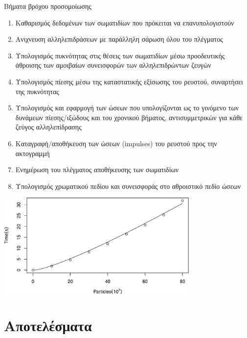 \documentclass[8pt,sans,mathserif,aspectratio=43]{beamer}
\newcommand{\eng}[1]{\selectlanguage{english}#1\selectlanguage{greek}}
\begin{document}

\begin{frame}{Βήματα βρόχου προσομοίωσης}
  \begin{enumerate}
  \item Καθαρισμός δεδομένων των σωματιδίων που πρόκειται να επανυπολογιστούν \pause
  \item Ανιχνευση αλληλεπιδράσεων με παράλληλη σάρωση όλου του πλέγματος \pause
  \item Υπολογισμός πυκνότητας στις θέσεις των σωματιδίων μέσω προοδευτικής άθροισης των
    αμοιβαίων συνεισφορών των αλληλεπιδρώντων ζευγών \pause
  \item Υπολογισμός πίεσης μέσω της καταστατικής εξίσωσης του ρευστού, συναρτήσει της
    πυκνότητας \pause
  \item Υπολογισμός και εφαρμογή των ώσεων που υπολογίζονται ως το γινόμενο των δυνάμεων
    πίεσης/ιξώδους και του χρονικού βήματος, αντισυμμετρικών για κάθε ζεύγος
    αλληλεπίδρασης \pause
  \item Καταγραφή/αποθήκευση των ώσεων (\eng{impulses}) του ρευστού προς την ακτογραμμή
    \pause
  \item Ενημέρωση του πλέγματος αποθήκευσης των σωματιδίων \pause
  \item Υπολογισμός χρωματικού πεδίου και συνεισφοράς στο αθροιστικό πεδίο ώσεων \pause
  \end{enumerate}
  \begin{center}
    \includegraphics[width=0.75\textwidth]{figures/performance.pdf}
  \end{center}
\end{frame}


\section{Αποτελέσματα}
\end{document}
